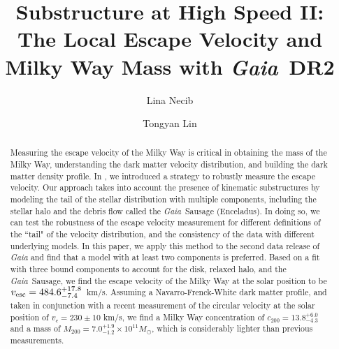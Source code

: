 \documentclass[twocolumn,preprintnumbers]{aastex63}
\newcommand{\Gaia}{\textit{Gaia}~}
\newcommand{\vesc}{v_{\rm esc}}
\begin{document}
\title{
Substructure at High Speed II: The Local Escape Velocity and Milky Way Mass with \Gaia DR2
}

\author{Lina Necib}

\author{Tongyan Lin}



\begin{abstract}
Measuring the escape velocity of the Milky Way is critical in obtaining the mass of the Milky Way, understanding the dark matter velocity distribution, and building the dark matter density profile. 
%
In \cite{methodology}, we introduced a strategy to robustly measure the escape velocity. 
%
Our approach takes into account the presence of kinematic substructures by modeling the tail of the stellar distribution with multiple components, including the stellar halo and the debris flow called the \Gaia Sausage (Enceladus). 
%
In doing so, we can test the robustness of the escape velocity measurement for different definitions of the ``tail" of the velocity distribution, and the consistency of the data with different underlying models. 
%
In this paper, we apply this method to the second data release of \emph{Gaia} and find that a model with at least two components is preferred.
%
Based on a fit with three bound components to account for the disk, relaxed halo, and the \Gaia Sausage, we find the escape velocity of the Milky Way at the solar position to be $\vesc = 484.6^{+17.8}_{-7.4}$~km/s.
%
Assuming a Navarro-Frenck-White dark matter profile, and taken in conjunction with a recent measurement of the circular velocity at the solar position of $v_c = 230 \pm 10$ km/s, we find a Milky Way concentration of $c_{200} = 13.8^{+6.0}_{-4.3}$ and a mass of $M_{200} = 7.0^{+1.9}_{-1.2} \times 10^{11} M_{\odot}$, which is considerably lighter than previous measurements.  \\
\end{abstract}
\end{document}

